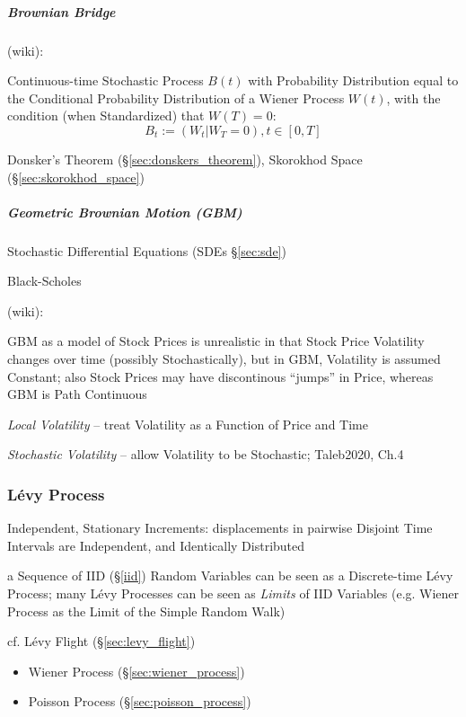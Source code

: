 \subparagraph{Brownian Bridge}\label{sec:brownian_bridge}\hfill

(wiki):

Continuous-time Stochastic Process $B(t)$ with Probability Distribution equal to
the Conditional Probability Distribution of a Wiener Process $W(t)$, with the
condition (when Standardized) that $W(T) = 0$:
\[
  B_t := (W_t | W_T = 0), t \in [0,T]
\]

\fist Donsker's Theorem (\S\ref{sec:donskers_theorem}), Skorokhod Space
(\S\ref{sec:skorokhod_space})



\subparagraph{Geometric Brownian Motion (GBM)}\label{sec:gbm}\hfill

Stochastic Differential Equations (SDEs \S\ref{sec:sde})

Black-Scholes

(wiki):

GBM as a model of Stock Prices is unrealistic in that Stock Price Volatility
changes over time (possibly Stochastically), but in GBM, Volatility is assumed
Constant; also Stock Prices may have discontinous ``jumps'' in Price, whereas
GBM is Path Continuous

\emph{Local Volatility} -- treat Volatility as a Function of Price and Time

\emph{Stochastic Volatility} -- allow Volatility to be Stochastic;
Taleb2020, Ch.4



\subsubsection{L\'evy Process}\label{sec:levy_process}

Independent, Stationary Increments: displacements in pairwise Disjoint Time
Intervals are Independent, and Identically Distributed

\fist a Sequence of IID (\S\ref{iid}) Random Variables can be seen as a
Discrete-time L\'evy Process; many L\'evy Processes can be seen as \emph{Limits}
of IID Variables (e.g. Wiener Process as the Limit of the Simple Random Walk)

\fist cf. L\'evy Flight (\S\ref{sec:levy_flight})

\begin{itemize}
  \item Wiener Process (\S\ref{sec:wiener_process})
  \item Poisson Process (\S\ref{sec:poisson_process})
\end{itemize}

